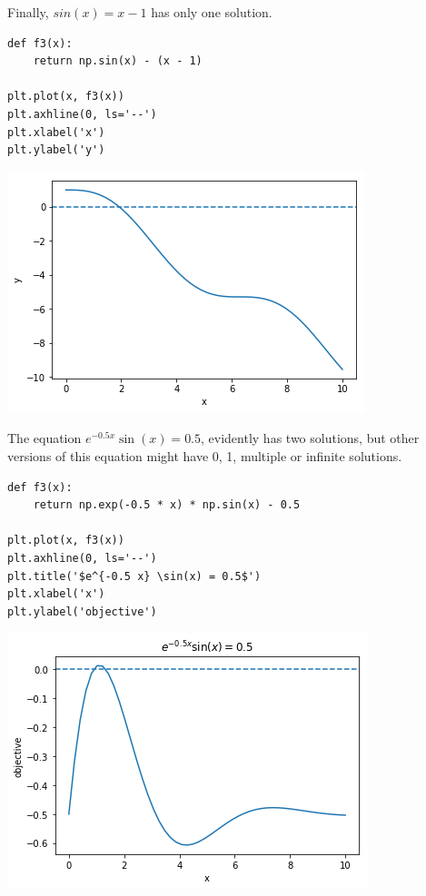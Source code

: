 \documentclass[11pt]{article}
\begin{document}
Finally, \(sin(x) = x - 1\) has only one solution.

\begin{verbatim}
def f3(x):
    return np.sin(x) - (x - 1)

plt.plot(x, f3(x))
plt.axhline(0, ls='--')
plt.xlabel('x')
plt.ylabel('y')
\end{verbatim}

\begin{center}
\includegraphics[width=.9\linewidth]{obipy-resources/a42b059ba3fd2f94b3a34f1c9b427f54-267297HX.png}
\end{center}

The equation \(e^{-0.5 x} \sin(x) = 0.5\), evidently has two solutions, but other versions of this equation might have 0, 1, multiple or infinite solutions.

\begin{verbatim}
def f3(x):
    return np.exp(-0.5 * x) * np.sin(x) - 0.5

plt.plot(x, f3(x))
plt.axhline(0, ls='--')
plt.title('$e^{-0.5 x} \sin(x) = 0.5$')
plt.xlabel('x')
plt.ylabel('objective')
\end{verbatim}

\begin{center}
\includegraphics[width=.9\linewidth]{obipy-resources/a42b059ba3fd2f94b3a34f1c9b427f54-26729ISd.png}
\end{center}
\end{document}
